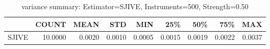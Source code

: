 \begin{table}[ht]
\centering
\caption{variance summary: Estimator=SJIVE, Instruments=500, Strength=0.50}
\begin{tabular}{lrrrrrrrr}
\toprule
 & COUNT & MEAN & STD & MIN & 25\% & 50\% & 75\% & MAX \\
\midrule
SJIVE & 10.0000 & 0.0020 & 0.0010 & 0.0005 & 0.0015 & 0.0019 & 0.0022 & 0.0037 \\
\bottomrule
\end{tabular}
\end{table}
